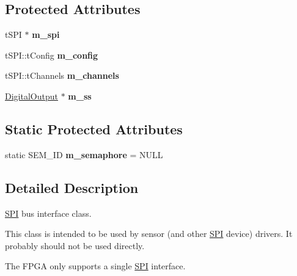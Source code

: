 \subsection*{\-Protected \-Attributes}
\begin{DoxyCompactItemize}
\item 
\hypertarget{classSPI_a2e51fd2a5f60a207e1948fcce6ce4b6a}{t\-S\-P\-I $\ast$ {\bfseries m\-\_\-spi}}\label{classSPI_a2e51fd2a5f60a207e1948fcce6ce4b6a}

\item 
\hypertarget{classSPI_a246566dd89a56e47235573fa1cbf4650}{t\-S\-P\-I\-::t\-Config {\bfseries m\-\_\-config}}\label{classSPI_a246566dd89a56e47235573fa1cbf4650}

\item 
\hypertarget{classSPI_a400f5597cc5fa5d5ec4e53b16e7e563a}{t\-S\-P\-I\-::t\-Channels {\bfseries m\-\_\-channels}}\label{classSPI_a400f5597cc5fa5d5ec4e53b16e7e563a}

\item 
\hypertarget{classSPI_abb5b7fdb1d7bd262f01f1955611dad04}{\hyperlink{classDigitalOutput}{\-Digital\-Output} $\ast$ {\bfseries m\-\_\-ss}}\label{classSPI_abb5b7fdb1d7bd262f01f1955611dad04}

\end{DoxyCompactItemize}
\subsection*{\-Static \-Protected \-Attributes}
\begin{DoxyCompactItemize}
\item 
\hypertarget{classSPI_a5526fc62f7ed652c65ab9e4a5f778062}{static \-S\-E\-M\-\_\-\-I\-D {\bfseries m\-\_\-semaphore} = \-N\-U\-L\-L}\label{classSPI_a5526fc62f7ed652c65ab9e4a5f778062}

\end{DoxyCompactItemize}


\subsection{\-Detailed \-Description}
\hyperlink{classSPI}{\-S\-P\-I} bus interface class.

\-This class is intended to be used by sensor (and other \hyperlink{classSPI}{\-S\-P\-I} device) drivers. \-It probably should not be used directly.

\-The \-F\-P\-G\-A only supports a single \hyperlink{classSPI}{\-S\-P\-I} interface. 

